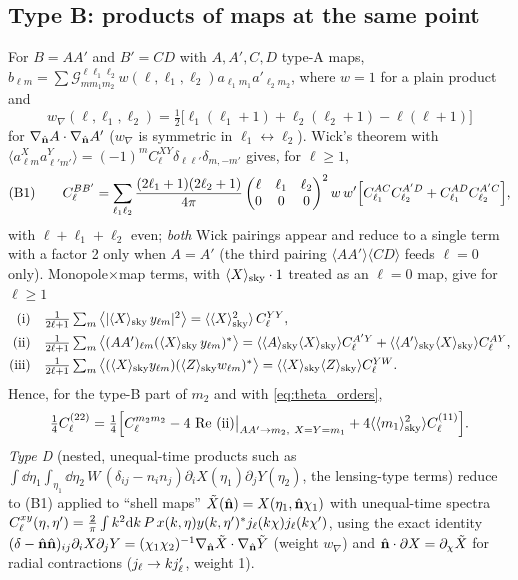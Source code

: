 \subsection{Type B: products of maps at the same point}
\label{sec:typeB}
For $B=AA'$ and $B'=CD$ with $A,A',C,D$ type-A maps, $b_{\ell m}=\sum\mathcal G^{\ell\ell_1\ell_2}_{mm_1m_2}w(\ell,\ell_1,\ell_2)a_{\ell_1m_1}a'_{\ell_2m_2}$,
where $w=1$ for a plain product and
\begin{equation}
w_\nabla(\ell,\ell_1,\ell_2)=\tfrac12\big[\ell_1(\ell_1+1)+\ell_2(\ell_2+1)-\ell(\ell+1)\big]
\label{eq:wgrad}
\end{equation}
for $\nabla_{\hat{\mathbf n}}A\cdot\nabla_{\hat{\mathbf n}}A'$ ($w_\nabla$ is symmetric in $\ell_1\leftrightarrow\ell_2$).  Wick's theorem with
$\langle a^X_{\ell m}a^Y_{\ell'm'}\rangle=(-1)^mC^{XY}_\ell\delta_{\ell\ell'}\delta_{m,-m'}$ gives, for $\ell\ge1$,
\begin{equation}
\text{(B1)}\qquad C^{BB'}_\ell=\sum_{\ell_1\ell_2}\frac{(2\ell_1+1)(2\ell_2+1)}{4\pi}\begin{pmatrix}\ell&\ell_1&\ell_2\\0&0&0\end{pmatrix}^2
w\,w'\Big[C^{AC}_{\ell_1}C^{A'D}_{\ell_2}+C^{AD}_{\ell_1}C^{A'C}_{\ell_2}\Big],
\label{eq:B1}
\end{equation}
with $\ell+\ell_1+\ell_2$ even; \emph{both} Wick pairings appear and reduce to a single term with a factor 2
only when $A=A'$ (the third pairing $\langle AA'\rangle\langle CD\rangle$ feeds $\ell=0$ only).
Monopole$\times$map terms, with $\langle X\rangle_{\rm sky}\cdot1$ treated as an $\ell=0$ map, give for $\ell\ge1$
\begin{align}
\text{(i)}&\quad \tfrac1{2\ell+1}\textstyle\sum_m\big\langle|\langle X\rangle_{\rm sky}\,y_{\ell m}|^2\big\rangle=\langle\langle X\rangle_{\rm sky}^2\rangle\,C^{YY}_\ell,\nonumber\\
\text{(ii)}&\quad \tfrac1{2\ell+1}\textstyle\sum_m\big\langle(AA')_{\ell m}(\langle X\rangle_{\rm sky}\,y_{\ell m})^*\big\rangle=\langle\langle A\rangle_{\rm sky}\langle X\rangle_{\rm sky}\rangle C^{A'Y}_\ell+\langle\langle A'\rangle_{\rm sky}\langle X\rangle_{\rm sky}\rangle C^{AY}_\ell,\nonumber\\
\text{(iii)}&\quad \tfrac1{2\ell+1}\textstyle\sum_m\big\langle(\langle X\rangle_{\rm sky} y_{\ell m})(\langle Z\rangle_{\rm sky} w_{\ell m})^*\big\rangle=\langle\langle X\rangle_{\rm sky}\langle Z\rangle_{\rm sky}\rangle C^{YW}_\ell .
\label{eq:monopole_terms}
\end{align}
Hence, for the type-B part of $m_2$ and with \eqref{eq:theta_orders},
\begin{equation}
\tfrac14C^{(22)}_\ell=\tfrac14\Big[C^{m_2m_2}_\ell-4\,\operatorname{Re}\,\text{(ii)}\big|_{AA'\to m_2,\ X=Y=m_1}+4\langle\langle m_1\rangle_{\rm sky}^2\rangle C^{(11)}_\ell\Big].
\label{eq:C22_B}
\end{equation}
\emph{Type D} (nested, unequal-time products such as $\int\dd\eta_1\int_{\eta_1}\dd\eta_2\,W\,(\delta_{ij}-n_in_j)\partial_iX(\eta_1)\partial_jY(\eta_2)$,
the lensing-type terms) reduce to (B1) applied to ``shell maps'' $\tilde X(\hat{\mathbf n})=X(\eta_1,\hat{\mathbf n}\chi_1)$ with
unequal-time spectra $C^{xy}_\ell(\eta,\eta')=\frac2\pi\int k^2\mathrm d k\,P\,x(k,\eta)y(k,\eta')^*j_\ell(k\chi)j_\ell(k\chi')$, using the exact identity
$(\delta-\hat{\mathbf n}\hat{\mathbf n})_{ij}\partial_iX\partial_jY=(\chi_1\chi_2)^{-1}\nabla_{\hat{\mathbf n}}\tilde X\cdot\nabla_{\hat{\mathbf n}}\tilde Y$ (weight $w_\nabla$) and
$\hat{\mathbf n}\cdot\partial X=\partial_\chi\tilde X$ for radial contractions ($j_\ell\to kj_\ell'$, weight 1).

